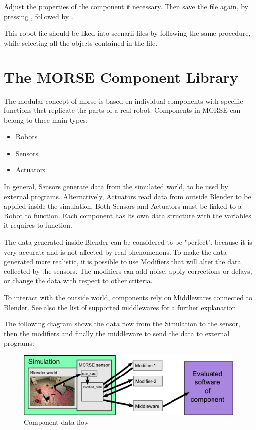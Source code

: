 \documentclass[twoside,a4paper,10pt]{report}
\newcommand{\key}[1]{\fcolorbox{Dark}{Light}{\textbf{#1}}}
\newcommand{\dokutitlelevelone}[1]{\chapter{#1}}
\newcommand{\dokuitem}{\item}
\begin{document}
Adjust the properties of the component if necessary. Then save the file again, by pressing \key{Ctrl + W}, followed by \key{Enter}.

This robot file should be liked into scenarii files by following the same procedure, while selecting all the objects contained in the file.

\dokutitlelevelone{The MORSE Component Library}
\label{1d548ae3d571b50e147fca31be425d0f}%
\label{004fdec0cc1a00c19c57e892b7eb1400}%

The modular concept of morse is based on individual components with specific functions that replicate the parts of a real robot. Components in MORSE can belong to three main types:


\begin{itemize}
\dokuitem  \hyperref[d69ac14cd721dd995822d4e984f48116]{ Robots}
\dokuitem  \hyperref[029aee483db9ae244d7a5cb353e74602]{ Sensors}
\dokuitem  \hyperref[2068e59180763f350d66a42e828e7f96]{ Actuators}
\end{itemize}

In general, Sensors generate data from the simulated world, to be used by external programs. Alternatively, Actuators read data from outside Blender to be applied inside the simulation. Both Sensors and Actuators must be linked to a Robot to function.
Each component has its own data structure with the variables it requires to function.

The data generated inside Blender can be considered to be "perfect", because it is very accurate and is not affected by real phenomenons. To make the data generated more realistic, it is possible to use \hyperref[bf24b44a8cc99e648657b164c8aba758]{ Modifiers} that will alter the data collected by the sensors. The modifiers can add noise, apply corrections or delays, or change the data with respect to other criteria.

To interact with the outside world, components rely on Middlewares connected to Blender. See also \hyperref[9a05db9c4b60b0527010fd997682f523]{ the list of supported middlewares} for a further explanation.

The following diagram shows the data flow from the Simulation to the sensor, then the modifiers and finally the middleware to send the data to external programs:
\begin{figure}[h]
\centering
\includegraphics[width=500pt]{component_diagram.png}
\caption{Component data flow}
\end{figure}
\end{document}
